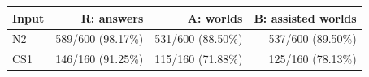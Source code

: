 \begin{tabular}{lrrr}
\toprule
Input & R: answers & A: worlds & B: assisted worlds \\
\midrule
N2 & 589/600 (98.17\%) & 531/600 (88.50\%) & 537/600 (89.50\%) \\
CS1 & 146/160 (91.25\%) & 115/160 (71.88\%) & 125/160 (78.13\%) \\
\bottomrule
\end{tabular}
